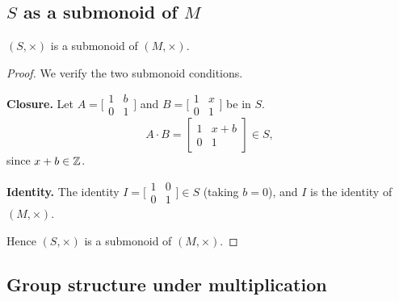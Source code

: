 \subsection{\texorpdfstring{$S$}{S} as a submonoid of \texorpdfstring{$M$}{M}}

\begin{proposition}
$(S, \times)$ is a submonoid of $(M, \times)$.
\end{proposition}
\begin{proof}
We verify the two submonoid conditions.

\textbf{Closure.} Let $A = \bigl[\begin{smallmatrix}1&b\\0&1\end{smallmatrix}\bigr]$
and $B = \bigl[\begin{smallmatrix}1&x\\0&1\end{smallmatrix}\bigr]$ be in $S$.
\[
    A \cdot B
    = \begin{bmatrix} 1 & x+b \\ 0 & 1 \end{bmatrix} \in S,
\]
since $x + b \in \mathbb{Z}$.

\textbf{Identity.} The identity $I = \bigl[\begin{smallmatrix}1&0\\0&1\end{smallmatrix}\bigr] \in S$
(taking $b = 0$), and $I$ is the identity of $(M, \times)$.

Hence $(S, \times)$ is a submonoid of $(M, \times)$.
\end{proof}

\subsection{Group structure under multiplication}


